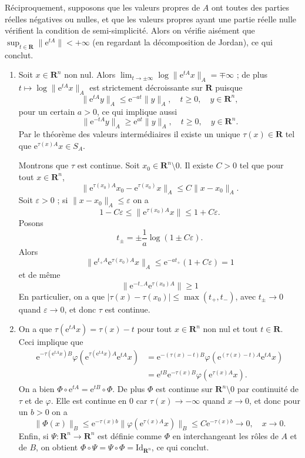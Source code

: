\documentclass[a4paper,12pt,openany]{article}
\theoremstyle{plain}
\theoremstyle{definition}
\newcommand{\e}{\mathrm{e}}
\newcommand{\R}{\mathbf{R}}
\newcommand{\Id}{\mathrm{Id}}
\begin{document}
\begin{enumerate}
R\'eciproquement, supposons que les valeurs propres de $A$ ont toutes des parties r\'eelles n\'egatives ou nulles, et que les valeurs propres ayant une partie r\'eelle nulle v\'erifient la condition de semi-simplicit\'e. Alors on v\'erifie ais\'ement que $\sup_{t\in \R} \|\e^{tA}\| < + \infty$ (en regardant la d\'ecomposition de Jordan), ce qui conclut.
\end{enumerate}
\vspace{0.6cm}

 \vspace{1.5mm} 

\begin{enumerate}
\item Soit $x \in \R^n$ non nul. Alors $\lim_{t \to \pm \infty} \log \|\e^{tA}x\|_A = \mp \infty$ ; de plus $t \mapsto \log \|\e^{tA}x\|_A$ est strictement d\'ecroissante sur $\R$ puisque
$$
\|\e^{tA}y\|_A \leq \e^{-at} \|y\|_A, \quad t \geq 0, \quad y \in \R^n,
$$
pour un certain $a>0$, ce qui implique aussi
$$
\|\e^{-tA}y\|_A \geq \e^{at} \|y\|_A, \quad t \geq 0, \quad y \in \R^n.
$$
Par le th\'eor\`eme des valeurs interm\'ediaires il existe un unique $\tau(x) \in \R$ tel que $\e^{\tau(x)A}x \in S_A.$

Montrons que $\tau$ est continue. Soit $x_0 \in \R^n \setminus 0$. Il existe $C>0$ tel que pour tout $x \in \R^n$,
$$
\|\e^{\tau(x_0)A}x_0 - \e^{\tau(x_0)}x\|_A \leq C \|x-x_0\|_A.
$$
Soit $\varepsilon >0$ ; si $\|x-x_0\|_A \leq \varepsilon$ on a
$$
1- C\varepsilon \leq \|\e^{\tau(x_0)A}x\| \leq 1 + C\varepsilon.
$$
Posons 
$$
t_\pm = \pm \frac{1}{a} \log(1 \pm C \varepsilon).
$$
Alors
$$
\|\e^{t_+A} \e^{\tau(x_0)A}x \|_A \leq \e^{-at_+}(1+C\varepsilon) = 1
$$
et de m\^eme
$$
\|\e^{-t_-A} \e^{\tau(x_0)A} \|\geq 1
$$
En particulier, on a que $|\tau(x)-\tau(x_0)| \leq \max(t_+, t_-)$, avec $t_\pm \to 0$ quand $\varepsilon \to 0$, et donc $\tau$ est continue.


\item On a que $\tau(\e^{tA}x) = \tau(x)-t$ pour tout $x \in \R^n$ non nul et tout $t \in \R$. Ceci implique que
$$
\begin{aligned}
\e^{-\tau(\e^{tA}x)B}\varphi(\e^{\tau(\e^{tA}x)A}\e^{tA}x) &= \e^{-(\tau(x)-t)B}\varphi(\e^{(\tau(x)-t)A}\e^{tA}x) \\
&= \e^{tB} \e^{-\tau(x)B}\varphi(\e^{\tau(x)A}x).
\end{aligned}
$$
On a bien $\Phi \circ \e^{tA} = \e^{tB} \circ \Phi$. De plus $\Phi$ est continue sur $\R^n\setminus 0$ par continuit\'e de $\tau$ et de $\varphi$. Elle est continue en $0$ car $\tau(x) \to -\infty$ quand $x \to 0$, et donc pour un $b>0$ on a
$$
\|\Phi(x)\|_B \leq \e^{-\tau(x)b} \|\varphi(\e^{\tau(x)A}x)\|_B \leq C \e^{-\tau(x)b} \to 0, \quad x \to 0.
$$
Enfin, si $\Psi : \R^n \to \R^n$ est d\'efinie comme $\Phi$ en interchangeant les r\^oles de $A$ et de $B$, on obtient $\Phi \circ \Psi = \Psi \circ \Phi = \Id_{\R^n}$, ce qui conclut.


\end{enumerate}
\end{document}
